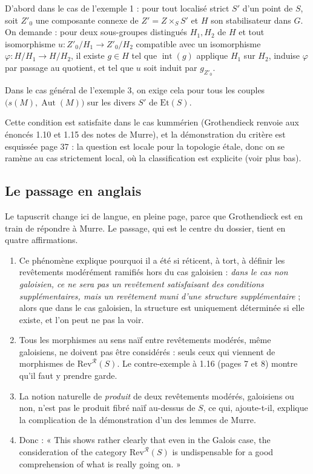 \documentclass[11pt,a4paper]{article}
\begin{document}
D'abord dans le cas de l'exemple 1 : pour tout localisé
strict $S'$ d'un point de $S$, soit $Z'_{0}$ une composante connexe de
$Z' = Z \times_{S} S'$ et $H$ son stabilisateur dans $G$. On demande : pour
deux sous-groupes distingués $H_{1}, H_{2}$ de $H$ et tout isomorphisme
$u : Z'_{0}/H_{1} \to Z'_{0}/H_{2}$ compatible avec un isomorphisme
$\varphi : H/H_{1} \to H/H_{2}$, il existe $g \in H$ tel que
$\operatorname{int}(g)$ applique $H_{1}$ sur $H_{2}$, induise $\varphi$ par
passage au quotient, et tel que $u$ soit induit par $g_{Z'_{0}}$.

Dans le cas général de l'exemple 3, on exige cela pour tous les couples
$\bigl(s(M), \operatorname{Aut}(M)\bigr)$ sur les divers $S'$ de
$\mathrm{Et}(S)$.

Cette condition est satisfaite dans le cas kummérien (Grothendieck renvoie
aux énoncés 1.10 et 1.15 des notes de Murre), et la démonstration du critère
est esquissée page 37 : la question est locale pour la topologie étale, donc on
se ramène au cas strictement local, où la classification est explicite (voir
plus bas).

\subsection*{Le passage en anglais}

Le tapuscrit change ici de langue, en pleine page, parce que
Grothendieck est en train de répondre à Murre. Le passage, qui est le centre du
dossier, tient en quatre affirmations.

\begin{enumerate}
  \item Ce phénomène explique pourquoi il a été si réticent, à tort,
    à définir les revêtements modérément ramifiés hors du cas galoisien :
    \emph{dans le cas non galoisien, ce ne sera pas un revêtement satisfaisant
    des conditions supplémentaires, mais un revêtement muni d'une structure
    supplémentaire} ; alors que dans le cas galoisien, la structure est
    uniquement déterminée si elle existe, et l'on peut ne pas la voir.
  \item Tous les morphismes au sens naïf entre revêtements modérés, même
    galoisiens, ne doivent pas être considérés : seuls ceux qui viennent de
    morphismes de $\mathrm{Rev}^{\mathcal{R}}(S)$. Le contre-exemple à 1.16 (pages 7 et 8) montre qu'il faut y prendre garde.
  \item La notion naturelle de \emph{produit} de deux revêtements modérés,
    galoisiens ou non, n'est pas le produit fibré naïf au-dessus de $S$,
    ce qui, ajoute-t-il, explique la complication de la démonstration d'un des
    lemmes de Murre.
  \item Donc : « This shows rather clearly that even in the Galois case, the
    consideration of the category $\mathrm{Rev}^{\mathcal{R}}(S)$ is
    undispensable for a good comprehension of what is really going on. »
\end{enumerate}
\end{document}
